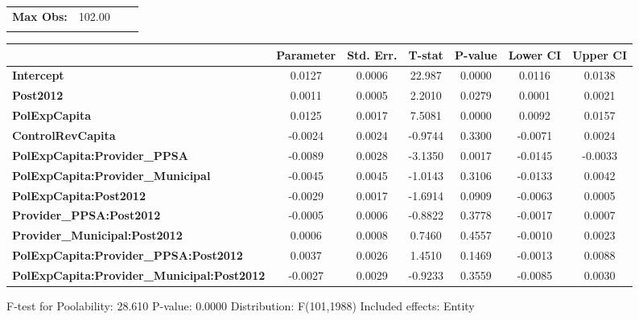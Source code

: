 \begin{center}
\begin{tabular}{lclc}
\textbf{Max Obs:}                                  &       102.00       & \textbf{                     }   &                  \\
\textbf{}                                          &                    & \textbf{                     }   &                  \\
\bottomrule
\end{tabular}
\begin{tabular}{lcccccc}
                                                   & \textbf{Parameter} & \textbf{Std. Err.} & \textbf{T-stat} & \textbf{P-value} & \textbf{Lower CI} & \textbf{Upper CI}  \\
\midrule
\textbf{Intercept}                                 &       0.0127       &       0.0006       &      22.987     &      0.0000      &       0.0116      &       0.0138       \\
\textbf{Post2012}                                  &       0.0011       &       0.0005       &      2.2010     &      0.0279      &       0.0001      &       0.0021       \\
\textbf{PolExpCapita}                              &       0.0125       &       0.0017       &      7.5081     &      0.0000      &       0.0092      &       0.0157       \\
\textbf{ControlRevCapita}                          &      -0.0024       &       0.0024       &     -0.9744     &      0.3300      &      -0.0071      &       0.0024       \\
\textbf{PolExpCapita:Provider\_PPSA}               &      -0.0089       &       0.0028       &     -3.1350     &      0.0017      &      -0.0145      &      -0.0033       \\
\textbf{PolExpCapita:Provider\_Municipal}          &      -0.0045       &       0.0045       &     -1.0143     &      0.3106      &      -0.0133      &       0.0042       \\
\textbf{PolExpCapita:Post2012}                     &      -0.0029       &       0.0017       &     -1.6914     &      0.0909      &      -0.0063      &       0.0005       \\
\textbf{Provider\_PPSA:Post2012}                   &      -0.0005       &       0.0006       &     -0.8822     &      0.3778      &      -0.0017      &       0.0007       \\
\textbf{Provider\_Municipal:Post2012}              &       0.0006       &       0.0008       &      0.7460     &      0.4557      &      -0.0010      &       0.0023       \\
\textbf{PolExpCapita:Provider\_PPSA:Post2012}      &       0.0037       &       0.0026       &      1.4510     &      0.1469      &      -0.0013      &       0.0088       \\
\textbf{PolExpCapita:Provider\_Municipal:Post2012} &      -0.0027       &       0.0029       &     -0.9233     &      0.3559      &      -0.0085      &       0.0030       \\
\bottomrule
\end{tabular}
\end{center}

F-test for Poolability: 28.610 \newline
 P-value: 0.0000 \newline
 Distribution: F(101,1988) \newline
  \newline
 Included effects: Entity
